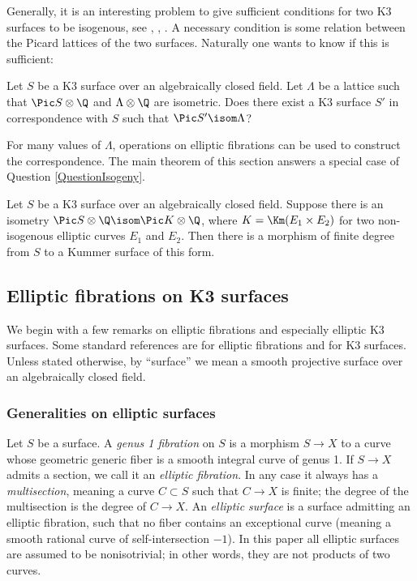 \documentclass{article}
\begin{document}
Generally, it is an interesting problem to give sufficient conditions for two K3 surfaces to be isogenous,  see \cite{Mukai}, \cite{Buskin}, \cite{Yang}.   A necessary condition is some relation between the Picard lattices of the two surfaces.  Naturally one wants to know if this is sufficient:  

\begin{question}\label{QuestionIsogeny} Let $S$ be a K3 surface over an algebraically closed field.  Let $\Lambda$ be a lattice such that $\Pic S\otimes \Q$ and $\Lambda\otimes\Q$ are isometric.  Does there exist a K3 surface $S'$ in correspondence with $S$ such that $\Pic S'\isom \Lambda$?
\end{question}

For many values of $\Lambda$, operations on elliptic fibrations can be used to construct the correspondence.  The main theorem of this section answers a special case of Question \ref{QuestionIsogeny}.

\begin{thm} \label{ThmIsogenyFromK3ToKummer} Let $S$ be a K3 surface over an algebraically closed field.  Suppose there is an isometry $\Pic S \otimes \Q\isom \Pic K\otimes \Q$, where $K=\Km(E_1\times E_2)$ for two non-isogenous elliptic curves $E_1$ and $E_2$.  Then there is a morphism of finite degree from $S$ to a Kummer surface of this form.
\end{thm}





\subsection{Elliptic fibrations on K3 surfaces}

We begin with a few remarks on elliptic fibrations and especially elliptic K3 surfaces.  Some standard references are \cite{SchuettShioda} for elliptic fibrations and \cite{huybrechts} for K3 surfaces.  Unless stated otherwise, by ``surface'' we mean a smooth projective surface over an algebraically closed field.

\subsubsection{Generalities on elliptic surfaces}  Let $S$ be a surface. A {\em genus 1 fibration} on $S$ is a morphism $S\to X$ to a curve whose geometric generic fiber is a smooth integral curve of genus 1.  If $S\to X$ admits a section, we call it an {\em elliptic fibration}.   In any case it always has a {\em multisection}, meaning a curve $C\subset S$ such that $C\to X$ is finite;  the degree of the multisection is the degree of $C\to X$.  An {\em elliptic surface} is a surface admitting an elliptic fibration, such that no fiber contains an exceptional curve (meaning a smooth rational curve of self-intersection $-1$).
In this paper all elliptic surfaces are assumed to be nonisotrivial; in other
words, they are not products of two curves.
\end{document}
